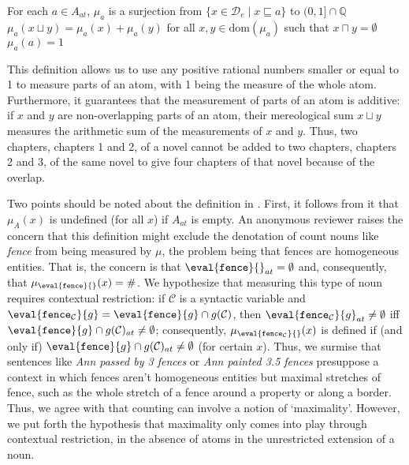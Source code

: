 \documentclass[output=paper]{langscibook}
\begin{document}
\ea \label{hai-tri:mu-a}
For each $a \in A_{at}$, 
\ea $\mu_a$ is a surjection from $\{x\in{\mathcal D}_e\mid x\sqsubseteq a\}$ to $(0,1] \cap\mathbb{Q}$
\ex $\mu_a(x\sqcup y) = \mu_a(x)+\mu_a(y)$ for all $x,y\in\mbox{dom}(\mu_a)$ such that $x\sqcap y=\emptyset$ \label{hai-tri:mu-a-b}
\ex $\mu_a(a)=1$
\z
\z

\noindent This definition allows us to use any positive rational numbers smaller or equal to 1 to measure parts of an atom, with 1 being the measure of the whole atom. Furthermore, it guarantees that the measurement of parts of an atom is additive: if $x$ and $y$ are non-overlapping parts of an atom, their mereological sum $x\sqcup y$ measures the arithmetic sum of the measurements of $x$ and $y$. Thus, two chapters, chapters 1 and 2, of a novel cannot be added to two chapters, chapters 2 and 3, of the same novel to give four chapters of that novel because of the overlap.

Two points should be noted about the definition in . First, it follows from it that $\mu_A(x)$ is undefined (for all $x$) if $A_{at}$ is empty. An anonymous reviewer raises the concern that this definition might exclude the denotation of count nouns like \textit{fence} from being measured by $\mu$, the problem being that fences are homogeneous entities. That is, the concern is that $\eval{\texttt{fence}}{}_{at} = \emptyset$ and, consequently, that $\mu_{\eval{\texttt{fence}}{}}(x) = \#$. We hypothesize that measuring this type of noun requires contextual restriction: if ${\mathcal C}$ is a syntactic variable and $\eval{\texttt{fence}_{\mathcal C}}{g} = \eval{\texttt{fence}}{g} \cap g({\mathcal C})$, then $\eval{\texttt{fence}_{\mathcal C}}{g}_{at} \ne \emptyset$ iff $\eval{\texttt{fence}}{g} \cap g({\mathcal C})_{at} \ne \emptyset$; consequently, $\mu_{\eval{\texttt{fence}_{\mathcal C}}{}}(x)$ is defined if (and only if) $\eval{\texttt{fence}}{g} \cap g({\mathcal C})_{at} \ne \emptyset$ (for certain $x$). Thus, we surmise that sentences like \textit{Ann passed by 3 fences} or \textit{Ann painted 3.5 fences} presuppose a context in which fences aren't homogeneous entities but maximal stretches of fence, such as the whole stretch of a fence around a property or along a border. Thus, we agree with \citet{wagiel2018thesis} that counting can involve a notion of `maximality'. However, we put forth the hypothesis that maximality only comes into play through contextual restriction, in the absence of atoms in the unrestricted extension of a noun. 
\end{document}
